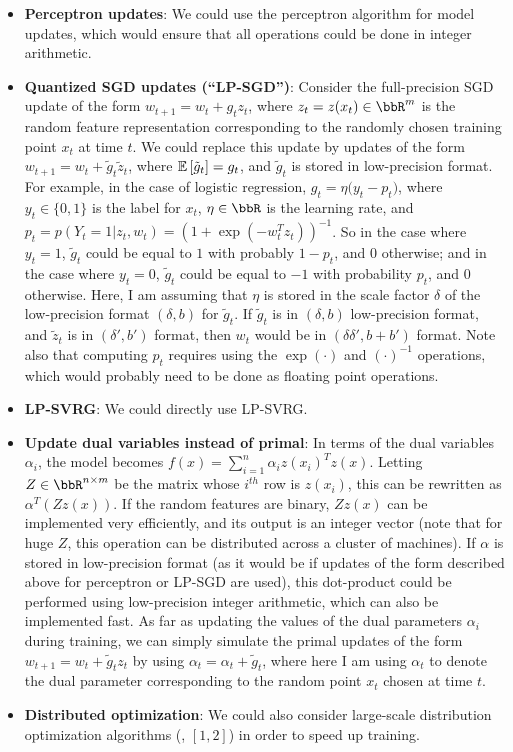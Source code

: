 \documentclass[12pt]{article}
\newcommand{\tg}{\tilde{g}}
\newcommand{\tz}{\tilde{z}}
\begin{document}
\begin{itemize}
	\item \textbf{Perceptron updates}: We could use the perceptron algorithm for model updates, 
	which would ensure that all operations could be done in integer arithmetic.
	\item\textbf{ Quantized SGD updates (``LP-SGD'')}: Consider the full-precision SGD update of
	the form $w_{t+1} = w_t + g_t z_t$, where $z_t = z(x_t) \in \RR^m$ is the random
	feature representation corresponding to the randomly chosen training point $x_t$ at
	time $t$.  We could replace this update by updates of the form 
	$w_{t+1} = w_t + \tg_t \tz_t$, where $\expect{}{\tg_t} = g_t$, and $\tg_t$ is stored in
	low-precision format.  For example, in the case of logistic regression, 
	$g_t = \eta \big(y_t - p_t\big)$, where $y_t\in\{0,1\}$ is the label for $x_t$, $\eta \in \RR$ is the learning
	rate, and $p_t = p(Y_t=1|z_t,w_t) = (1+\exp(-w_t^Tz_t))^{-1}$.  So in the case where $y_t = 1$,
	$\tg_t$ could be equal to $1$ with probably $1-p_t$, and 0 otherwise; and in the case
	where $y_t = 0$, $\tg_t$ could be equal to $-1$ with probability $p_t$, and 0
	otherwise.  Here, I am assuming that $\eta$ is stored in the scale factor $\delta$
	of the low-precision format $(\delta,b)$ for $\tg_t$.	
	If $\tg_t$ is in $(\delta,b)$ low-precision format, and $\tz_t$ is in
	$(\delta',b')$ format, then $w_t$ would be in $(\delta\delta',b+b')$ format.
	Note also that computing $p_t$ requires using the $\exp(\cdot)$
	and $(\cdot)^{-1}$ operations, which would probably need to be done as floating point
	operations.
	\item \textbf{LP-SVRG}: We could directly use LP-SVRG.
	\item \textbf{Update dual variables instead of primal}: In terms of the dual variables $\alpha_i$, the
	model becomes $f(x) = \sum_{i=1}^n \alpha_i z(x_i)^T z(x)$. Letting 
	$Z\in \RR^{n\times m}$ be the matrix whose $i^{th}$ row is $z(x_i)$, this can be
	rewritten as $\alpha^T (Z z(x))$.  If the random features are binary, $Zz(x)$ 
	can be implemented very efficiently, and its output is an integer vector (note that for huge $Z$,
	this operation can be distributed across a cluster of machines).
	If $\alpha$ is stored in low-precision format (as it would be if updates of the form described above
	for perceptron or LP-SGD are used), this dot-product could be performed using low-precision
	integer arithmetic, which can also be implemented fast.  As far as updating the values of
	the dual parameters $\alpha_i$ during training, we can simply simulate the primal updates of the form 
	$w_{t+1} = w_t + \tg_t z_t$ by using $\alpha_t = \alpha_t + \tg_t$, where here I am using 
	$\alpha_t$ to denote the dual parameter corresponding to the random point $x_t$ chosen at time $t$.
	\item \textbf{Distributed optimization}: We could also consider large-scale distribution optimization algorithms (\eg, $[1,2]$) in order to speed up training.
\end{itemize}
\end{document}
